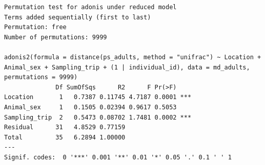 \documentclass[
  letterpaper,
  DIV=11,
  numbers=noendperiod]{scrartcl}
\newenvironment{Shaded}{\begin{snugshade}}{\end{snugshade}}
\newcommand{\AttributeTok}[1]{\textcolor[rgb]{0.40,0.45,0.13}{#1}}
\newcommand{\CommentTok}[1]{\textcolor[rgb]{0.37,0.37,0.37}{#1}}
\newcommand{\DecValTok}[1]{\textcolor[rgb]{0.68,0.00,0.00}{#1}}
\newcommand{\DocumentationTok}[1]{\textcolor[rgb]{0.37,0.37,0.37}{\textit{#1}}}
\newcommand{\FunctionTok}[1]{\textcolor[rgb]{0.28,0.35,0.67}{#1}}
\newcommand{\NormalTok}[1]{\textcolor[rgb]{0.00,0.23,0.31}{#1}}
\newcommand{\OtherTok}[1]{\textcolor[rgb]{0.00,0.23,0.31}{#1}}
\newcommand{\SpecialCharTok}[1]{\textcolor[rgb]{0.37,0.37,0.37}{#1}}
\newcommand{\StringTok}[1]{\textcolor[rgb]{0.13,0.47,0.30}{#1}}
\begin{document}
\begin{Shaded}
\end{Shaded}

\begin{verbatim}
Permutation test for adonis under reduced model
Terms added sequentially (first to last)
Permutation: free
Number of permutations: 9999

adonis2(formula = distance(ps_adults, method = "unifrac") ~ Location + Animal_sex + Sampling_trip + (1 | individual_id), data = md_adults, permutations = 9999)
              Df SumOfSqs      R2      F Pr(>F)    
Location       1   0.7387 0.11745 4.7187 0.0001 ***
Animal_sex     1   0.1505 0.02394 0.9617 0.5053    
Sampling_trip  2   0.5473 0.08702 1.7481 0.0002 ***
Residual      31   4.8529 0.77159                  
Total         35   6.2894 1.00000                  
---
Signif. codes:  0 '***' 0.001 '**' 0.01 '*' 0.05 '.' 0.1 ' ' 1
\end{verbatim}
\end{document}
